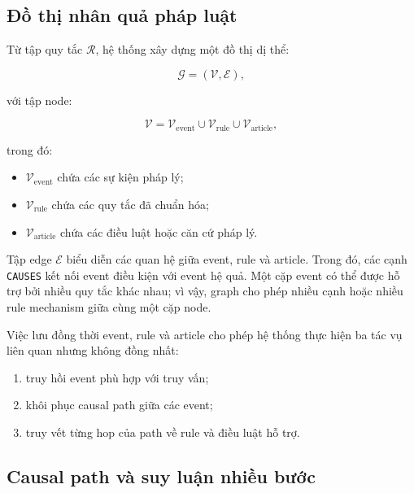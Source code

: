 \subsection{Đồ thị nhân quả pháp luật}

Từ tập quy tắc \(\mathcal{R}\), hệ thống xây dựng một đồ thị dị thể:

\begin{equation}
\mathcal{G}
=
\left(
    \mathcal{V},
    \mathcal{E}
\right),
\end{equation}

với tập node:

\begin{equation}
\mathcal{V}
=
\mathcal{V}_{\mathrm{event}}
\cup
\mathcal{V}_{\mathrm{rule}}
\cup
\mathcal{V}_{\mathrm{article}},
\end{equation}

trong đó:

\begin{itemize}
    \item \(\mathcal{V}_{\mathrm{event}}\) chứa các sự kiện pháp lý;
    \item \(\mathcal{V}_{\mathrm{rule}}\) chứa các quy tắc đã chuẩn hóa;
    \item \(\mathcal{V}_{\mathrm{article}}\) chứa các điều luật hoặc căn cứ
    pháp lý.
\end{itemize}

Tập edge \(\mathcal{E}\) biểu diễn các quan hệ giữa event, rule và article.
Trong đó, các cạnh \texttt{CAUSES} kết nối event điều kiện với event hệ quả.
Một cặp event có thể được hỗ trợ bởi nhiều quy tắc khác nhau; vì vậy, graph
cho phép nhiều cạnh hoặc nhiều rule mechanism giữa cùng một cặp node.

Việc lưu đồng thời event, rule và article cho phép hệ thống thực hiện ba tác
vụ liên quan nhưng không đồng nhất:

\begin{enumerate}
    \item truy hồi event phù hợp với truy vấn;
    \item khôi phục causal path giữa các event;
    \item truy vết từng hop của path về rule và điều luật hỗ trợ.
\end{enumerate}

\subsection{Causal path và suy luận nhiều bước}

